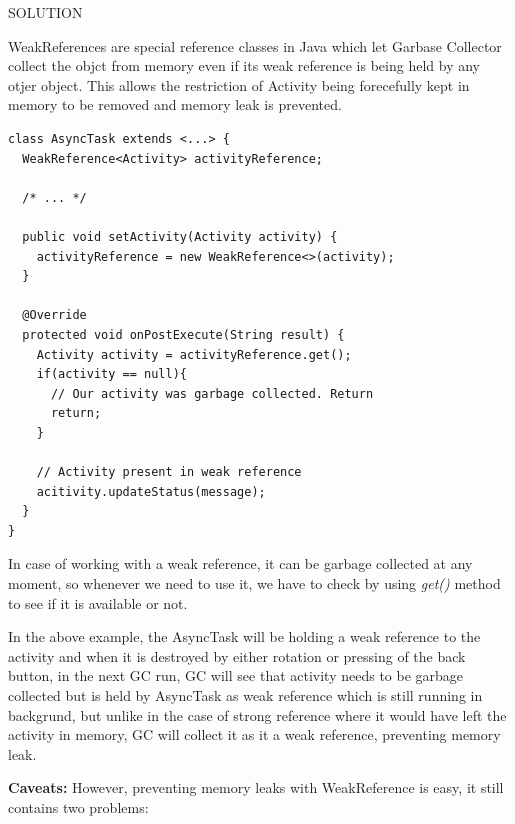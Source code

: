 \documentclass[journal]{IEEEtran}
\begin{document}
\newpage

\begin{center}
	SOLUTION
\end{center}

WeakReferences \cite{weak} are special reference classes in Java which let Garbase Collector collect the objct from memory even if its weak reference is being held by any otjer object. This allows the restriction of Activity being forecefully kept in memory to be removed and memory leak is prevented.

\begin{verbatim}
class AsyncTask extends <...> {
  WeakReference<Activity> activityReference;
  
  /* ... */
  
  public void setActivity(Activity activity) {
    activityReference = new WeakReference<>(activity);
  }
  
  @Override
  protected void onPostExecute(String result) {
    Activity activity = activityReference.get();
    if(activity == null){
      // Our activity was garbage collected. Return
      return;
    }
    
    // Activity present in weak reference
    acitivity.updateStatus(message);
  }
}
\end{verbatim}

In case of working with a weak reference, it can be garbage collected at any moment, so whenever we need to use it, we have to check by using \textit{get()} method to see if it is available or not.

In the above example, the AsyncTask will be holding a weak reference to the activity and when it is destroyed by either rotation or pressing of the back button, in the next GC run, GC will see that activity needs to be garbage collected but is held by AsyncTask as weak reference which is still running in backgrund, but unlike in the case of strong reference where it would have left the activity in memory, GC will collect it as it a weak reference, preventing memory leak.

\textbf{Caveats:} However, preventing memory leaks with WeakReference is easy, it still contains two problems:
\end{document}
